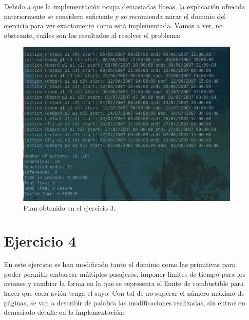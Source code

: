 \documentclass[11pt,a4paper]{article}
\begin{document}
Debido a que la implementación ocupa demasiadas líneas, la explicación ofrecida anteriormente se considera suficiente y se recomienda
mirar el dominio del ejercicio para ver exactamente como está implementada. Vamos a ver, no obsteante, cuáles son los resultados al
resolver el problema:

\begin{figure}[H]
\centering
\includegraphics[scale=0.4]{img/e3.png}
\caption{Plan obtenido en el ejercicio 3.}
\end{figure}

\section{Ejercicio 4}

En este ejercicio se han modificado tanto el dominio como las primitivas para poder permitir embarcar múltiples pasajeros, imponer
límites de tiempo para los aviones y cambiar la forma en la que se representa el límite de combustible para hacer que cada avión
tenga el suyo. Con tal de no superar el número máximo de páginas, se van a describir de palabra las modificaciones realizadas, sin
entrar en demasiado detalle en la implementación:
\end{document}
